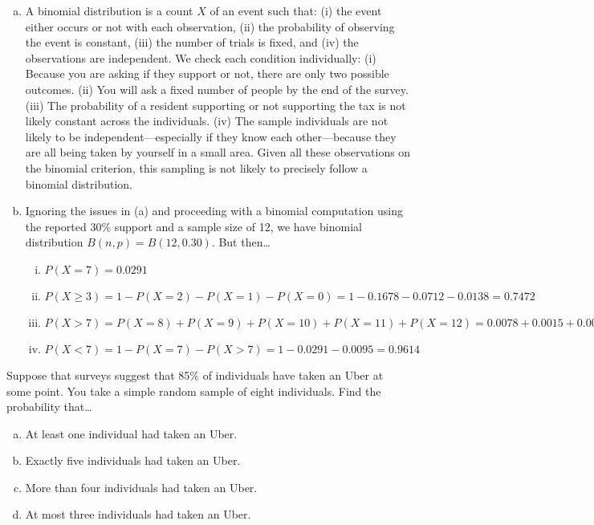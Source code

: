 \documentclass[11pt,letterpaper]{article}
\begin{document}
\sol 
\begin{enumerate}[(a)]
\item A binomial distribution is a count $X$ of an event such that: (i) the event either occurs or not with each observation, (ii) the probability of observing the event is constant, (iii) the number of trials is fixed, and (iv) the observations are independent. We check each condition individually: (i) Because you are asking if they support or not, there are only two possible outcomes. (ii) You will ask a fixed number of people by the end of the survey. (iii) The probability of a resident supporting or not supporting the tax is not likely constant across the individuals. (iv) The sample individuals are not likely to be independent---especially if they know each other---because they are all being taken by yourself in a small area. Given all these observations on the binomial criterion, this sampling is not likely to precisely follow a binomial distribution. 

\item Ignoring the issues in (a) and proceeding with a binomial computation using the reported 30\% support and a sample size of 12, we have binomial distribution $B(n, p)= B(12, 0.30)$. But then\dots
	\begin{enumerate}[(i)]
	\item $P(X= 7)= 0.0291$
	\item $P(X \geq 3)= 1 - P(X= 2) - P(X= 1) - P(X= 0)= 1 - 0.1678 - 0.0712 - 0.0138= 0.7472$
	\item $P(X > 7)= P(X= 8) + P(X= 9) + P(X= 10) + P(X= 11) + P(X= 12)= 0.0078 + 0.0015 + 0.0002 + 0 + 0= 0.0095$
	\item $P(X < 7)= 1 - P(X= 7) - P(X > 7)= 1 - 0.0291 - 0.0095= 0.9614$
	\end{enumerate}
\end{enumerate}



\newpage



 Suppose that surveys suggest that 85\% of individuals have taken an Uber at some point. You take a simple random sample of eight individuals. Find the probability that\dots
	\begin{enumerate}[(a)]
	\item At least one individual had taken an Uber. 
	\item Exactly five individuals had taken an Uber. 
	\item More than four individuals had taken an Uber. 
	\item At most three individuals had taken an Uber. 
	\end{enumerate} \pspace
\end{document}
